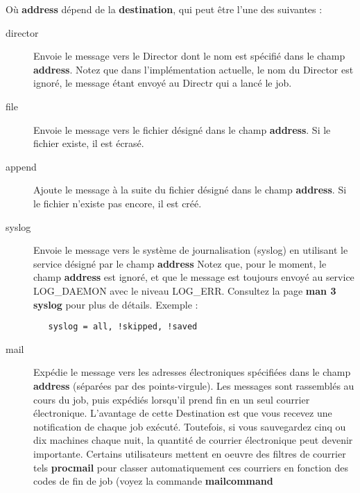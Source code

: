 \begin{description}
O\`u {\bf address} d\'epend de la {\bf destination}, qui peut \^etre l'une des suivantes :

\begin{description}

\item [director]
   Envoie le message vers le Director dont le nom est sp\'ecifi\'e dans le champ 
   {\bf address}. Notez que dans l'impl\'ementation actuelle, le nom du Director 
   est ignor\'e, le message \'etant envoy\'e au Directr qui a lanc\'e le job.

\item [file]
   Envoie le message vers le fichier d\'esign\'e dans le champ {\bf address}. Si le 
   fichier existe, il est \'ecras\'e.

\item [append]
   Ajoute le message \`a la suite du fichier d\'esign\'e dans le champ {\bf address}. 
   Si le fichier n'existe pas encore, il est cr\'e\'e.
   
\item [syslog]
   Envoie le message vers le syst\`eme de journalisation (syslog) en utilisant le 
   service d\'esign\'e par le champ {\bf address} Notez que, pour le moment, le champ 
   {\bf address} est ignor\'e, et que le message est toujours envoy\'e au service 
   LOG\_DAEMON avec le niveau LOG\_ERR. Consultez la page {\bf man 3 syslog} 
   pour plus de d\'etails. Exemple :
   
\begin{verbatim}
   syslog = all, !skipped, !saved
\end{verbatim}

\item [mail]
   Exp\'edie le message vers les adresses \'electroniques 
   sp\'ecifi\'ees dans le champ {\bf address} (s\'epar\'ees par des points-virgule). 
   Les messages sont rassembl\'es au cours du job, puis exp\'edi\'es lorsqu'il prend 
   fin en un seul courrier \'electronique. L'avantage de cette Destination est 
   que vous recevez une notification de chaque job ex\'ecut\'e. Toutefois, si vous 
   sauvegardez cinq ou dix machines chaque nuit, la quantit\'e de courrier 
   \'electronique peut devenir importante. Certains utilisateurs mettent en oeuvre 
   des filtres de courrier tels {\bf procmail} pour classer automatiquement ces 
   courriers en fonction des codes de fin de job (voyez la commande {\bf mailcommand}


\end{description}
\end{description}
